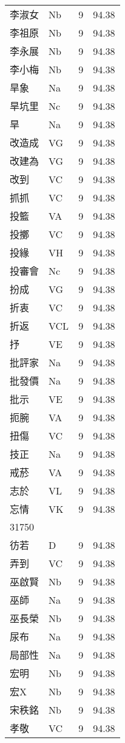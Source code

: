 \documentclass[twocolumn]{book}
\begin{document}
\begin{supertabular}{llrr}
李淑女 & Nb & 9 &  94.38\\
李祖原 & Nb & 9 &  94.38\\
李永展 & Nb & 9 &  94.38\\
李小梅 & Nb & 9 &  94.38\\
旱象 & Na & 9 &  94.38\\
旱坑里 & Nc & 9 &  94.38\\
旱 & Na & 9 &  94.38\\
改造成 & VG & 9 &  94.38\\
改建為 & VG & 9 &  94.38\\
改到 & VC & 9 &  94.38\\
抓抓 & VC & 9 &  94.38\\
投籃 & VA & 9 &  94.38\\
投擲 & VC & 9 &  94.38\\
投緣 & VH & 9 &  94.38\\
投審會 & Nc & 9 &  94.38\\
扮成 & VG & 9 &  94.38\\
折衷 & VC & 9 &  94.38\\
折返 & VCL & 9 &  94.38\\
抒 & VE & 9 &  94.38\\
批評家 & Na & 9 &  94.38\\
批發價 & Na & 9 &  94.38\\
批示 & VE & 9 &  94.38\\
扼腕 & VA & 9 &  94.38\\
扭傷 & VC & 9 &  94.38\\
技正 & Na & 9 &  94.38\\
戒菸 & VA & 9 &  94.38\\
志於 & VL & 9 &  94.38\\
忘情 & VK & 9 &  94.38\\
31750\\
彷若 & D & 9 &  94.38\\
弄到 & VC & 9 &  94.38\\
巫啟賢 & Nb & 9 &  94.38\\
巫師 & Na & 9 &  94.38\\
巫長榮 & Nb & 9 &  94.38\\
尿布 & Na & 9 &  94.38\\
局部性 & Na & 9 &  94.38\\
宏明 & Nb & 9 &  94.38\\
宏X & Nb & 9 &  94.38\\
宋秩銘 & Nb & 9 &  94.38\\
孝敬 & VC & 9 &  94.38\\

\end{supertabular}
\end{document}
